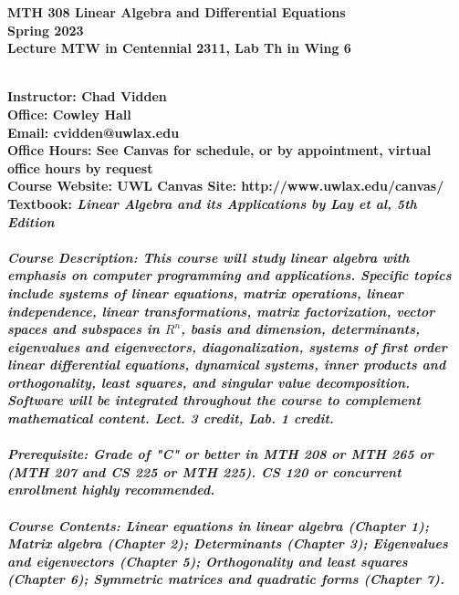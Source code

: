 \documentclass [11pt]{article}
\begin{document}
\begin {center}
\Large \bfseries MTH 308
Linear Algebra and Differential Equations \normalfont \normalsize \\
Spring 2023 \\
{\bf Lecture} MTW in Centennial 2311, {\bf Lab} Th in Wing 6
\end {center}
\ \\
\noindent
\bfseries Instructor: \normalfont Chad Vidden \\
\bfseries Office:  Cowley Hall \\
\bfseries Email: \normalfont cvidden@uwlax.edu \\
\bfseries Office Hours: \normalfont See Canvas for schedule, or by appointment, virtual office hours by request \normalfont  \\
\bfseries Course Website: \normalfont UWL Canvas Site: http://www.uwlax.edu/canvas/\\
\bfseries Textbook: \normalfont \itshape Linear Algebra and its Applications by Lay et al, 5th Edition \normalfont \\
\ \\
\bfseries Course Description: \normalfont This course will study linear algebra with emphasis on computer programming and applications. Specific topics include systems of linear equations, matrix operations, linear independence, linear transformations, matrix factorization, vector spaces and subspaces in $R^n$, basis and dimension, determinants, eigenvalues and eigenvectors, diagonalization, systems of first order linear differential equations, dynamical systems, inner products and orthogonality, least squares, and singular value decomposition. Software will be integrated throughout the course to complement mathematical content. Lect. 3 credit, Lab. 1 credit. \\ \ \\
\bfseries Prerequisite: \normalfont
Grade of "C" or better in MTH 208 or MTH 265 or (MTH 207 and CS 225 or MTH 225). CS 120 or concurrent enrollment highly recommended. \\
\ \\
\bfseries Course Contents: \normalfont Linear equations in linear algebra (Chapter 1);  Matrix algebra (Chapter 2);  Determinants (Chapter 3);  Eigenvalues and eigenvectors (Chapter 5); Orthogonality and least squares (Chapter 6);  Symmetric matrices and quadratic forms (Chapter 7). \\
\end{document}
